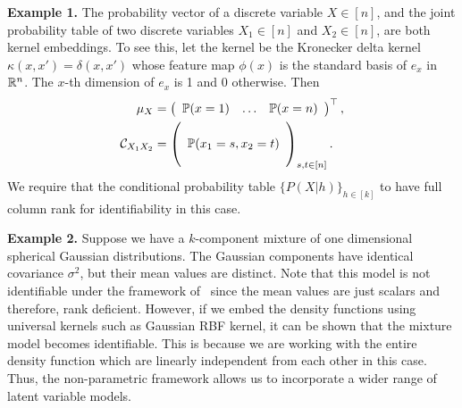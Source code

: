 \documentclass{article}
\begin{document}



{\bf Example 1.} The probability vector of a discrete variable $X \in [n]$, and the joint probability table of two discrete variables $X_1 \in [n]$ and $X_2 \in [n]$, are both kernel embeddings. To see this, let the kernel be the Kronecker delta kernel $\kappa(x,x') = \delta(x,x')$ whose feature map $\phi(x)$ is the standard basis of $e_{x}$ in $\mathbb{R}^n$. The $x$-th dimension of $e_{x}$ is 1 and 0 otherwise. Then
\begin{align}
    \mu_X
		& = \left(
      \begin{array}{ccc}
         \mathbb{P}(x = 1) &
         \hdots &
         \mathbb{P}(x = n)
       \end{array}
    \right)^\top, \nonumber \\
		\mathcal{C}_{X_1X_2}
		&=
		\left(
        \begin{array}{c}
            \cr
            \mathbb{P}(x_1=s,x_2=t) \cr
						\cr
        \end{array}
    \right)_{s,t \in [n]}. \nonumber
\end{align}
We require that the conditional probability table $\{P(X|h)\}_{h\in [k]}$ to  have full column rank for identifiability in this case.


{\bf Example 2.} Suppose we have a $k$-component mixture of one dimensional  spherical Gaussian distributions. The Gaussian components have identical covariance  $\sigma^2$, but their mean values are distinct. Note that this model is not identifiable under the framework of~\citet{HsuKak13} since the mean values are just scalars and therefore, rank deficient. However, if we embed the density functions using universal kernels such as Gaussian RBF kernel, it can be shown that the mixture model becomes identifiable. This is because we are working with the entire density function which are linearly independent from each other in this case. Thus, the non-parametric framework allows us to incorporate a wider range of latent variable  models.
\end{document}
